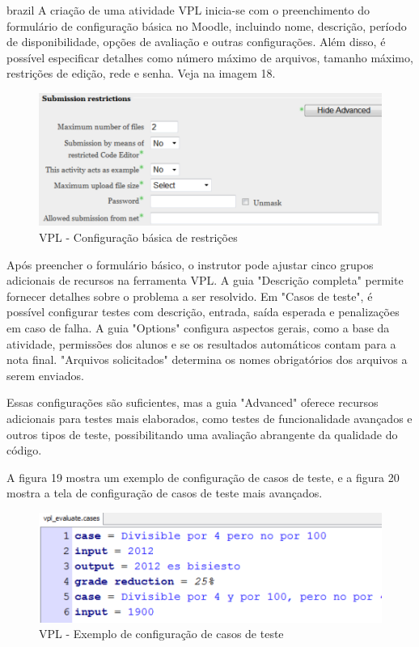 \begin{otherlanguage*}{brazil}
A criação de uma atividade VPL inicia-se com o preenchimento do formulário de configuração básica no Moodle, incluindo nome, descrição, período de disponibilidade, opções de avaliação e outras configurações. Além disso, é possível especificar detalhes como número máximo de arquivos, tamanho máximo, restrições de edição, rede e senha. Veja na imagem 18.

\begin{figure}[h!]
	   \centering
            \caption{VPL - Configuração básica de restrições}
            \label{fig:ModeloConceitual}
	   	\includegraphics[scale=0.5]{pictures/VPL_config_basica.png}
\end{figure}

Após preencher o formulário básico, o instrutor pode ajustar cinco grupos adicionais de recursos na ferramenta VPL. A guia "Descrição completa" permite fornecer detalhes sobre o problema a ser resolvido. Em "Casos de teste", é possível configurar testes com descrição, entrada, saída esperada e penalizações em caso de falha. A guia "Options" configura aspectos gerais, como a base da atividade, permissões dos alunos e se os resultados automáticos contam para a nota final. "Arquivos solicitados" determina os nomes obrigatórios dos arquivos a serem enviados. 

Essas configurações são suficientes, mas a guia "Advanced" oferece recursos adicionais para testes mais elaborados, como testes de funcionalidade avançados e outros tipos de teste, possibilitando uma avaliação abrangente da qualidade do código.

A figura 19 mostra um exemplo de configuração de casos de teste, e a figura 20 mostra a tela de configuração de casos de teste mais avançados.

\begin{figure}[h!]
	   \centering
            \caption{VPL - Exemplo de configuração de casos de teste}
            \label{fig:ModeloConceitual}
	   	\includegraphics[scale=0.5]{pictures/VPL_testes.png}
\end{figure}


\end{otherlanguage*}
